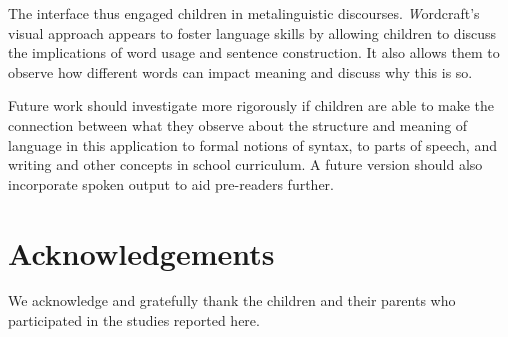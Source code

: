 \documentclass{sigchi-ext}
\begin{document}
The interface thus engaged children in metalinguistic discourses. \emph Wordcraft’s visual approach appears to foster language skills by allowing children to discuss the implications of word usage and sentence construction. It also allows them to observe how different words can impact meaning and discuss why this is so.

Future work should investigate more rigorously if children are able to make the connection between what they observe about the structure and meaning of language in this application to formal notions of syntax, to parts of speech, and writing and other concepts in school curriculum.  A future version should also incorporate spoken output to aid pre-readers further.

\section{Acknowledgements}
We acknowledge and gratefully thank the children and their parents who participated in the studies reported here.



%
%
%
%
\end{document}
